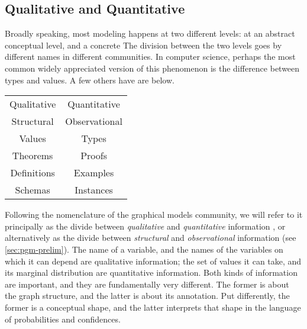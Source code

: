 \subsection{Qualitative and Quantitative}

Broadly speaking, most modeling happens at two different levels: 
    at an abstract conceptual level, and a concrete 
The division between the two levels goes by different names in different communities. 
In computer science, perhaps the most common
    widely appreciated version of this phenomenon is 
    the difference between types and values.
A few others have are below.

\begin{center}
    \begin{tabular}{c|c}
        Qualitative & Quantitative \\ 
        Structural & Observational \\
            \hline
        Values & Types \\ 
        Theorems & Proofs \\
        Definitions & Examples \\
        Schemas & Instances 
    \end{tabular}
    \end{center}
    
Following the nomenclature of the graphical models community, we will refer to it principally as the divide between \emph{qualitative} and \emph{quantitative} information 
\unskip, or alternatively as the divide between \emph{structural} and \emph{observational} information (see \cref{sec:pgm-prelim}).
The name of a variable, and the names of the variables on which it can depend are qualitative information; the set of values it can take, and its marginal distribution are quantitative information. 
%
Both kinds of information are important, and they are fundamentally very different. The former is about the graph structure, and the latter is about its annotation. Put differently,
the former is a conceptual shape, and the latter interprets that shape in the language of probabilities and confidences. 

